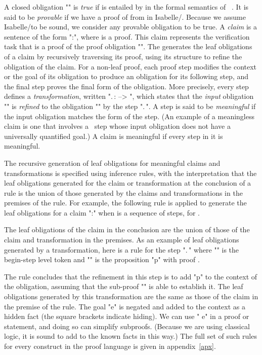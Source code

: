 \documentclass[a4paper]{easychair}
\begin{document}
A closed obligation "" is \textit{true} if  is
entailed by  in the formal semantics of
\tlaplus~\cite{lamport03tla}. It is said to be \emph{provable} if we
have a proof of  from  in Isabelle/\tlaplus. Because we assume
Isabelle/\tlaplus to be sound, we consider any provable obligation to
be true.  A \emph{claim} is a sentence of the form "\pi:", where  is a \tlatwo proof.  This claim represents the
verification task that  is a proof of the proof obligation
"". The \PM generates the leaf obligations of a claim by
recursively traversing its proof, using its structure to refine the
obligation of the claim. For a non-leaf proof, each proof step
modifies the context or the goal of its obligation to produce an
obligation for its following step, and the final \QED step proves the
final form of the obligation. More precisely, every step defines a
\textit{transformation}, written "\sigma.\,\tau:  -->
", which states that the \emph{input} obligation
"" is \emph{refined} to the obligation ""
by the step "\sigma.\,\tau". A step is said to be \textit{meaningful}
if the input obligation matches the form of the step. (An example of a
meaningless claim is one that involves a \TAKE\ step whose input
obligation does not have a universally quantified goal.) A claim is
meaningful if every step in it is meaningful.

The recursive generation of leaf obligations for meaningful claims and
transformations is specified using inference rules, with the
interpretation that the leaf obligations generated for the claim or
transformation at the conclusion of a rule is the union of those
generated by the claims and transformations in the premises of the
rule.  For example, the following rule is applied to generate the leaf
obligations for a claim "\pi:" when  is a sequence
of  steps, for .

The leaf obligations of the claim in the conclusion are the union of
those of the claim and transformation in the premises.  As an example
of leaf obligations generated by a transformation, here is a rule for
the step "\sigma.\,\tau" where "\sigma" is the begin-step level token
 and "\tau" is the proposition "p" with proof .

The rule concludes that the refinement in this step is to add "p" to
the context of the obligation, assuming that the sub-proof "\pi" is
able to establish it. The leaf obligations generated by this
transformation are the same as those of the claim in the premise of
the rule.  The goal "e" is negated and added to the context as a
hidden fact (the square brackets indicate hiding).  We can use "\lnot
e" in a \BY proof or \USE statement, and doing so can simplify
subproofs.  (Because we are using classical logic, it is sound to add
 to the known facts in this way.)
The full set of such rules for every construct in the \tlatwo proof
language is given in appendix~\ref{apx}.
\end{document}
